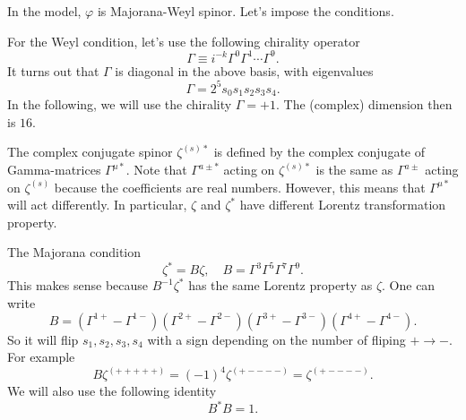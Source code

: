In the model, $\varphi$ is Majorana-Weyl spinor.
Let's impose the conditions.

For the Weyl condition, let's use the following chirality operator
\[
	\Gamma \equiv i^{-k} \Gamma^0 \Gamma^1 \cdots \Gamma^9
.\]
It turns out that $\Gamma$ is diagonal in the above basis,
with eigenvalues
\[
\Gamma = 2^5 s_0 s_1 s_2 s_3 s_4
.\] 
In the following, we will use the chirality $\Gamma = +1$.
The (complex) dimension then is $16$.

The complex conjugate spinor $\zeta^{(s)*}$ is defined by
the complex conjugate of Gamma-matrices $\Gamma^{\mu*}$.
Note that $\Gamma^{a\pm *}$ acting on $\zeta^{(s)*}$
is the same as $\Gamma^{a\pm}$ acting on $\zeta^{(s)}$
because the coefficients are real numbers.
However, this means that $\Gamma^{\mu*}$ will act differently.
In particular, $\zeta$ and $\zeta^*$ have different Lorentz transformation
property.

The Majorana condition 
\[
\zeta^* = B\zeta,\quad B = \Gamma^3 \Gamma^5 \Gamma^7 \Gamma^9
.\] 
This makes sense because $B^{-1}\zeta^*$ has the same Lorentz property as $\zeta$.
One can write
\[
	B = (\Gamma^{1+} - \Gamma^{1-})(\Gamma^{2+} - \Gamma^{2-})
	(\Gamma^{3+} - \Gamma^{3-})(\Gamma^{4+} - \Gamma^{4-})
.\] 
So it will flip $s_1,s_2,s_3,s_4$ with a sign depending on the number of fliping $+\to -$.
For example
\[
	B \zeta^{(+++++)} = (-1)^4 \zeta^{(+----)} = \zeta^{(+----)}
.\] 
We will also use the following identity
\[
B^* B = 1
.\] 

